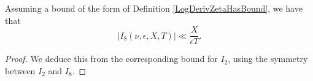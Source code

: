 \begin{lemma}[I8GenBound]
\label{I8GenBound}
\leanok
Assuming a bound of the form of Definition \ref{LogDerivZetaHasBound}, we have that
  $$
  \left|I_8(\nu,\epsilon,X,T)\right|\ll\frac{X}{\epsilon T}.
  $$
\end{lemma}
\begin{proof}
\leanok
We deduce this from the corresponding bound for $I_2$, using the symmetry between $I_2$ and $I_8$.
\end{proof}
